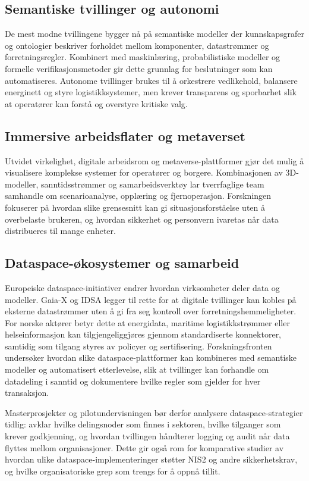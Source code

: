 \subsection{Semantiske tvillinger og autonomi}
De mest modne tvillingene bygger nå på semantiske modeller der kunnskapsgrafer og ontologier beskriver forholdet mellom komponenter, datastrømmer og forretningsregler. Kombinert med maskinlæring, probabilistiske modeller og formelle verifikasjonsmetoder gir dette grunnlag for beslutninger som kan automatiseres. Autonome tvillinger brukes til å orkestrere vedlikehold, balansere energinett og styre logistikksystemer, men krever transparens og sporbarhet slik at operatører kan forstå og overstyre kritiske valg.

\subsection{Immersive arbeidsflater og metaverset}
Utvidet virkelighet, digitale arbeidsrom og metaverse-plattformer gjør det mulig å visualisere komplekse systemer for operatører og borgere. Kombinasjonen av 3D-modeller, sanntidsstrømmer og samarbeidsverktøy lar tverrfaglige team samhandle om scenarioanalyse, opplæring og fjernoperasjon. Forskningen fokuserer på hvordan slike grensesnitt kan gi situasjonsforståelse uten å overbelaste brukeren, og hvordan sikkerhet og personvern ivaretas når data distribueres til mange enheter.

\subsection{Dataspace-økosystemer og samarbeid}
Europeiske dataspace-initiativer endrer hvordan virksomheter deler data og modeller. Gaia-X og IDSA legger til rette for at digitale tvillinger kan kobles på eksterne datastrømmer uten å gi fra seg kontroll over forretningshemmeligheter.\citep{gaiax2022architecture,idsa2023ram} For norske aktører betyr dette at energidata, maritime logistikkstrømmer eller helseinformasjon kan tilgjengeliggjøres gjennom standardiserte konnektorer, samtidig som tilgang styres av policyer og sertifisering. Forskningsfronten undersøker hvordan slike dataspace-plattformer kan kombineres med semantiske modeller og automatisert etterlevelse, slik at tvillinger kan forhandle om datadeling i sanntid og dokumentere hvilke regler som gjelder for hver transaksjon.

Masterprosjekter og pilotundervisningen bør derfor analysere dataspace-strategier tidlig: avklar hvilke delingsnoder som finnes i sektoren, hvilke tilganger som krever godkjenning, og hvordan tvillingen håndterer logging og audit når data flyttes mellom organisasjoner. Dette gir også rom for komparative studier av hvordan ulike dataspace-implementeringer støtter NIS2 og andre sikkerhetskrav, og hvilke organisatoriske grep som trengs for å oppnå tillit.\citep{rcn2024digitalisering}

